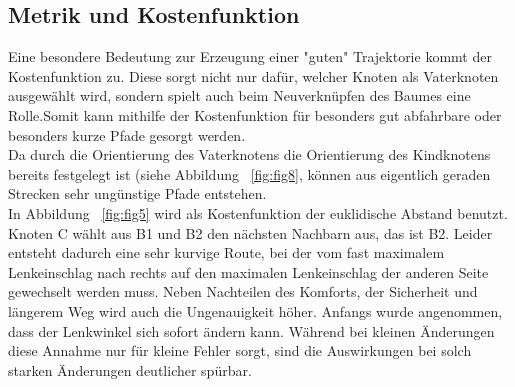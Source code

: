 \subsection{Metrik und Kostenfunktion}
\label{sec:Metrik}
Eine besondere Bedeutung zur Erzeugung einer "guten" Trajektorie kommt der Kostenfunktion zu. Diese sorgt nicht nur dafür, welcher Knoten als Vaterknoten ausgewählt wird, sondern spielt auch beim Neuverknüpfen des Baumes eine Rolle.Somit kann mithilfe der Kostenfunktion für besonders gut abfahrbare oder besonders kurze Pfade gesorgt werden. \\
Da durch die Orientierung des Vaterknotens die Orientierung des Kindknotens bereits festgelegt ist (siehe Abbildung ~\ref{fig:fig8}, können aus eigentlich geraden Strecken sehr ungünstige Pfade entstehen.\\
 In Abbildung ~\ref{fig:fig5} wird als Kostenfunktion der euklidische Abstand benutzt. Knoten C wählt aus B1 und B2 den nächsten Nachbarn aus, das ist B2. Leider entsteht dadurch eine sehr kurvige Route, bei der vom fast maximalem Lenkeinschlag nach rechts auf den maximalen Lenkeinschlag der anderen Seite gewechselt werden muss. Neben Nachteilen des Komforts, der Sicherheit und längerem Weg wird auch die Ungenauigkeit höher. Anfangs wurde angenommen, dass der Lenkwinkel sich sofort ändern kann. Während bei kleinen Änderungen diese Annahme nur für kleine Fehler sorgt, sind die Auswirkungen bei solch starken Änderungen deutlicher spürbar.


